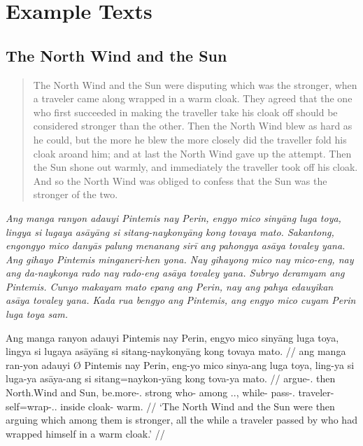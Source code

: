 \chapter{Example Texts}

\section{The North Wind and the Sun}
\citep[From][]{becker:northwind}

\blockcquote[39]{ipa2007}{The North Wind and the Sun were disputing which was the stronger, when a traveler came along wrapped in a warm cloak. They agreed that the one who first succeeded in making the traveller take his cloak off should be considered stronger than the other. Then the North Wind blew as hard as he could, but the more he blew the more closely did the traveller fold his cloak aroand him; and at last the North Wind gave up the attempt. Then the Sun shone out warmly, and immediately the traveller took off his cloak. And so the North Wind was obliged to confess that the Sun was the stronger of the two.}

\medskip

{\itshape \noindent Ang manga ranyon adauyi Pintemis nay Perin, engyo mico
sinyāng luga toya, lingya si lugaya asāyāng si sitang-naykonyāng kong tovaya
mato. Sakantong, engongyo mico danyās palung menanang sirī ang pahongya asāya
tovaley yana. Ang gihayo Pintemis minganeri-hen yona. Nay gihayong mico nay
mico-eng, nay ang da-naykonya rado nay rado-eng asāya tovaley yana. Subryo
deramyam ang Pintemis. Cunyo makayam mato epang ang Perin, nay ang pahya
edauyikan asāya tovaley yana. Kada rua bengyo ang Pintemis, ang engyo mico
cuyam Perin luga toya sam.}\medskip

\ex %
\begingl
	\gla Ang manga ranyon adauyi {} Pintemis nay Perin, engyo mico sinyāng luga toya, lingya si lugaya asāyāng si sitang-naykonyāng kong tovaya mato. //
	\glb ang manga ran-yon adauyi Ø Pintemis nay Perin, eng-yo mico sinya-ang luga toya, ling-ya si luga-ya asāya-ang si sitang=naykon-yāng kong tova-ya mato. //
	\glc \AgtT{} \Prog{} argue-\Tpl{}.\N{} then \Top{} North.Wind and Sun, be.more-\Tsg{}.\N{} strong who-\Aarg{} among \Tpl{}.\N{}.\Loc{}, while-\Loc{} \Rel{} pass-\Tsg{}.\M{} traveler-\Aarg{} \Rel{} self=wrap-\Tsg{}.\M{}.\Aarg{} inside cloak-\Loc{} warm. //
	\glft `The North Wind and the Sun were then arguing which among them is stronger, all the while a traveler passed by who had wrapped himself in a warm cloak.' //
\endgl
\xe

